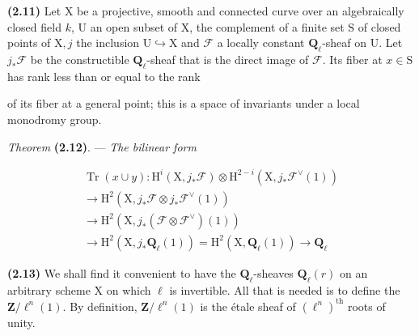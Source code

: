 \documentclass[10pt,leqno]{article}
\begin{document}
\noindent \textbf{(2.11)} Let \(\mathrm{X}\) be a projective, smooth and connected curve over an algebraically closed field \(k\), \(\mathrm{U}\) an open subset of \(\mathrm{X}\), the complement of a finite set \(\mathrm{S}\) of closed points of \(\mathrm{X}, j\) the inclusion \(\mathrm{U}\hookrightarrow \mathrm{X}\) and \(\mathcal{F} \) a locally constant \(\mathbf{Q}_{\ell }\)-sheaf on \(\mathrm{U}\). Let \(j_{*}\mathcal{F} \) be the constructible \(\mathbf{Q}_{\ell }\)-sheaf that is the direct image of \(\mathcal{F} \). Its fiber at \(x\in \mathrm{S}\) has rank less than or equal to the rank\par

\clearpage

\label{physical-12}

\noindent of its fiber at a general point; this is a space of invariants under a local monodromy group.\par

\noindent \emph{Theorem} \textbf{(2.12)}. — {\itshape The bilinear form}\par

\begin{equation*}\begin{gathered}\operatorname{Tr}(x\cup y) : \mathrm{H}^{i}(\mathrm{X},j_{*}\mathcal{F} )\otimes \mathrm{H}^{2- i}(\mathrm{X},j_{*}\mathcal{F} ^{\vee }(1)) \\ \longrightarrow  \mathrm{H}^{2}(\mathrm{X},j_{*}\mathcal{F} \otimes j_{*}\mathcal{F} ^{\vee }(1)) \\ \longrightarrow  \mathrm{H}^{2}(\mathrm{X},j_{*}(\mathcal{F} \otimes \mathcal{F} ^{\vee })(1)) \\ \longrightarrow  \mathrm{H}^{2}(\mathrm{X},j_{*}\mathbf{Q}_{\ell }(1)) = \mathrm{H}^{2}(\mathrm{X},\mathbf{Q}_{\ell }(1)) \longrightarrow  \mathbf{Q}_{\ell }\end{gathered}\end{equation*}

\par

\noindent \textbf{(2.13)} We shall find it convenient to have the \(\mathbf{Q}_{\ell }\)-sheaves \(\mathbf{Q}_{\ell }(r)\) on an arbitrary scheme \(\mathrm{X}\) on which \(\ell \) is invertible. All that is needed is to define the \(\mathbf{Z}/\ell ^{n}(1)\). By definition, \(\mathbf{Z}/\ell ^{n}(1)\) is the étale sheaf of \((\ell ^{n})^{\mathrm{th}}\) roots of unity.\par
\end{document}
